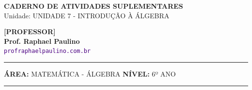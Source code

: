 
\usepackage{titlesec}
\titleformat{\section}{\color{black}\large\bfseries}{\thesection}{0em}{\vspace{0.1cm}\titlerule[0.8pt]}
\titlespacing*{\section}{0pt}{10pt}{6pt} 
\titleformat{\subsubsection}[runin]{\color{black}\bfseries}{}{0em}{}
\titlespacing*{\subsubsection}{0pt}{0pt}{0.15cm}

\usepackage{multicol}
\setlength{\columnsep}{1cm}
\setlength{\columnseprule}{0.5pt}
\def\columnseprulecolor{\color{CorLinha}}
\usepackage{adjustbox, tikz, pgfplots, circuitikz}
\usetikzlibrary{shadows, shapes.misc, positioning, calc}
\pgfplotsset{compat=1.18}


\thispagestyle{empty}
\color{Cinzablack}
\vspace*{-1.8cm}

\noindent
\begin{minipage}{\textwidth}
    \selectfont
    \noindent
    \begin{minipage}[t]{0.65\linewidth}
        {\Large \bfseries \MakeUppercase{Caderno de Atividades Suplementares}}\\[0.1cm]
        {\large \textmd{\textcolor{CinzaEscuro}{Unidade: UNIDADE 7 - INTRODUÇÃO À ÁLGEBRA}}}
    \end{minipage}%
    \begin{minipage}[t]{0.35\linewidth}
        \raggedleft
        \ifgabarito
            {\large \bfseries \textcolor{CorTitUm}{[PROFESSOR]}}\\[0.05cm]
        \fi
        \small \textbf{Prof. Raphael Paulino}\\
        \textsf{\small \textcolor{indigo}{\texttt{profraphaelpaulino.com.br}}}
    \end{minipage}
    
    \vspace{0.15cm}
    \noindent\rule{\linewidth}{1.2pt}
    \vspace{-0.1cm}
    \footnotesize\textsf{\textbf{ÁREA:} MATEMÁTICA - ÁLGEBRA \hfill \textbf{NÍVEL:} 6º ANO}
    \vspace{0.1cm}
    \noindent\rule{\linewidth}{0.4pt}
\end{minipage}

